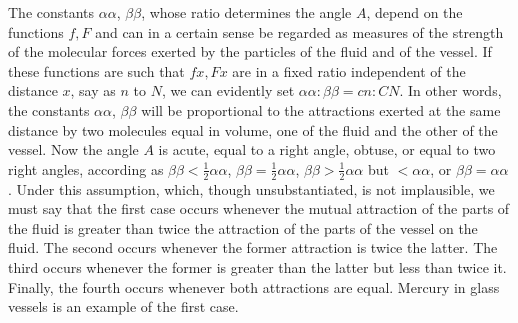 The constants $\alpha\alpha$, $\beta\beta$, whose ratio determines the angle $A$, depend on the functions $f,F$ and can in a certain sense be regarded as measures of the strength of the molecular forces exerted by the particles of the fluid and of the vessel. If these functions are such that $fx,Fx$ are in a fixed ratio independent of the distance $x$, say as $n$ to $N$, we can evidently set
$\alpha\alpha:\beta\beta=cn:CN$. In other words, the constants $\alpha\alpha$, $\beta\beta$ will be proportional to the attractions exerted at the same distance by two molecules equal in volume, one of the fluid and the other of the vessel. Now the angle $A$ is acute, equal to a right angle, obtuse, or equal to two right angles, according as $\beta\beta<\frac12\alpha\alpha$, $\beta\beta=\frac12\alpha\alpha$, $\beta\beta>\frac12\alpha\alpha$ but $<\alpha\alpha$, or $\beta\beta=\alpha\alpha$. Under this assumption, which, though unsubstantiated, is not implausible, we must say that the first case occurs whenever the mutual attraction of the parts of the fluid is greater than twice the attraction of the parts of the vessel on the fluid. The second occurs whenever the former attraction is twice the latter. The third occurs whenever the former is greater than the latter but less than twice it. Finally, the fourth occurs whenever both attractions are equal. Mercury in glass vessels is an example of the first case.

